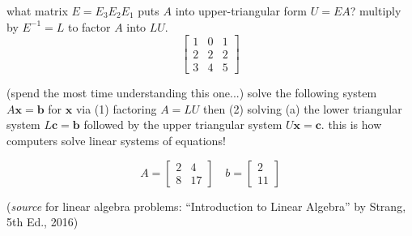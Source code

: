 \documentclass[addpoints]{exam}
\begin{document}
\begin{questions}
\question what matrix $E=E_3E_2E_1$ puts $A$ into upper-triangular form $U=EA$? multiply by $E^{-1}=L$ to factor $A$ into $LU$.
\begin{equation*}
	\begin{bmatrix}
	1 & 0 & 1  \\
	2 & 2 & 2 \\
	3 & 4 & 5
	\end{bmatrix}
\end{equation*}

\question (spend the most time understanding this one...) solve the following system $A\mathbf{x}=\mathbf{b}$ for $\mathbf{x}$ via (1) factoring $A=LU$ then (2) solving (a) the lower triangular system $L\mathbf{c}=\mathbf{b}$ followed by the upper triangular system $U\mathbf{x}=\mathbf{c}$. this is how computers solve linear systems of equations!

\begin{equation*}
	A = \begin{bmatrix}
	2 & 4  \\
	8 & 17
	\end{bmatrix}
	\quad
	b = \begin{bmatrix}
	2  \\
	11 
	\end{bmatrix}
\end{equation*}


\end{questions}

 (\emph{source} for linear algebra problems: ``Introduction to Linear Algebra'' by Strang, 5th Ed., 2016)
\end{document}

